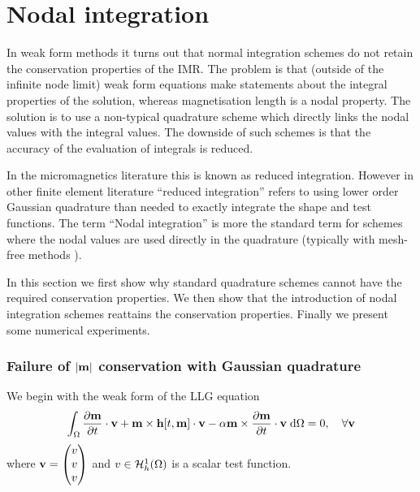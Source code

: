 \chapter{Nodal integration}
\label{sec:nodal-integration}


In weak form methods it turns out that normal integration schemes do not retain the conservation properties of the IMR.
The problem is that (outside of the infinite node limit) weak form equations make statements about the integral properties of the solution, whereas magnetisation length is a nodal property.
The solution is to use a non-typical quadrature scheme which directly links the nodal values with the integral values.
The downside of such schemes is that the accuracy of the evaluation of integrals is reduced.

In the micromagnetics literature this is known as reduced integration\cite{Cimrak2008}.
However in other finite element literature ``reduced integration'' refers to using lower order Gaussian quadrature than needed to exactly integrate the shape and test functions.
The term ``Nodal integration'' is more the standard term for schemes where the nodal values are used directly in the quadrature (typically with mesh-free methods \eg \cite{Puso2008}).

In this section we first show why standard quadrature schemes cannot have the required conservation properties.
We then show that the introduction of nodal integration schemes reattains the conservation properties.
Finally we present some numerical experiments.



\subsection{Failure of $\left|{\mathbf{m}} \right|$ conservation with Gaussian quadrature}

\newcommand{\ipg}[2]{\intd{{#1} \cdot {#2}}}

We begin with the weak form of the LLG equation
\begin{equation}
  \label{eq:weak-llg}
  {\int_{\Omega} \frac{\partial \mathbf{m}}{\partial t}\cdot \mathbf{v}+ \mathbf{m}\times \mathbf{h}[t, \mathbf{m}] \cdot \mathbf{v}- \alpha\mathbf{m}\times \frac{\partial \mathbf{m}}{\partial t}\cdot \mathbf{v}{\; \text{d}}{\Omega}} = 0, \quad \forall \mathbf{v}
\end{equation}
where $\mathbf{v} = \begin{pmatrix} v \\ v \\ v \end{pmatrix}$ and $v \in {\mathcal{H}^1_h(\Omega)}$ is a scalar test function.

\newcommand{\midpoint}[1]{\hat{#1}}
\newsubcommand{\mvm}{\midpoint{\mv}}{n}
\newcommand{\tm}{\midpoint{t}_n}

